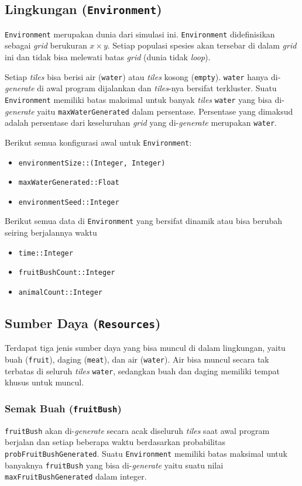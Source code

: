 \documentclass[12pt]{article}
\begin{document}
\subsection{Lingkungan (\texttt{Environment})}
\texttt{Environment} merupakan dunia dari simulasi ini. \texttt{Environment} didefinisikan sebagai \textit{grid} berukuran $x\times y$. Setiap populasi spesies akan tersebar di dalam \textit{grid} ini dan tidak bisa melewati batas \textit{grid} (dunia tidak \textit{loop}). 

\noindent Setiap \textit{tiles} bisa berisi air (\texttt{water}) atau \textit{tiles} kosong (\texttt{empty}). \texttt{water} hanya di-\textit{generate} di awal program dijalankan dan \textit{tiles}-nya bersifat terkluster. Suatu \texttt{Environment} memiliki batas maksimal untuk banyak \textit{tiles} \texttt{water} yang bisa di-\textit{generate} yaitu \texttt{maxWaterGenerated} dalam persentase. Persentase yang dimaksud adalah persentase dari keseluruhan \textit{grid} yang di-\textit{generate} merupakan \texttt{water}.

\noindent Berikut semua konfigurasi awal untuk \texttt{Environment}:
\begin{itemize}
    \item \texttt{environmentSize::(Integer, Integer)}
    \item \texttt{maxWaterGenerated::Float}
    \item \texttt{environmentSeed::Integer}
\end{itemize}

\noindent Berikut semua data di \texttt{Environment} yang bersifat dinamik atau bisa berubah seiring berjalannya waktu
\begin{itemize}
    \item \texttt{time::Integer}
    \item \texttt{fruitBushCount::Integer}
    \item \texttt{animalCount::Integer}
\end{itemize}
\subsection{Sumber Daya (\texttt{Resources})}
Terdapat tiga jenis sumber daya yang bisa muncul di dalam lingkungan, yaitu buah (\texttt{fruit}), daging (\texttt{meat}), dan air (\texttt{water}). Air bisa muncul secara tak terbatas di seluruh \textit{tiles} \texttt{water}, sedangkan buah dan daging memiliki tempat khusus untuk muncul.

\subsubsection{Semak Buah (\texttt{fruitBush})}
\texttt{fruitBush} akan di-\textit{generate} secara acak diseluruh \textit{tiles} saat awal program berjalan dan setiap beberapa waktu berdasarkan probabilitas \texttt{probFruitBushGenerated}. Suatu \texttt{Environment} memiliki batas maksimal untuk banyaknya \texttt{fruitBush} yang bisa di-\textit{generate} yaitu suatu nilai \texttt{maxFruitBushGenerated} dalam integer.
\end{document}
